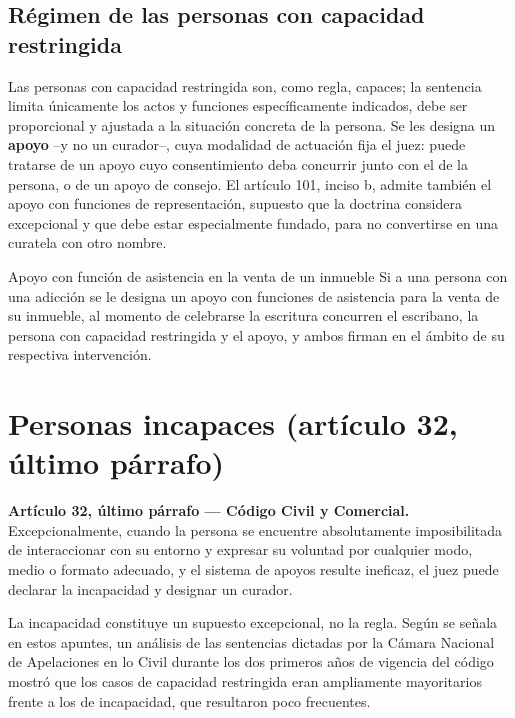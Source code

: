 \documentclass[12pt,oneside]{book}
\begin{document}
\subsection{Régimen de las personas con capacidad restringida}

Las personas con capacidad restringida son, como regla, capaces; la sentencia limita únicamente los actos y funciones específicamente indicados, debe ser proporcional y ajustada a la situación concreta de la persona. Se les designa un \textbf{apoyo} --y no un curador--, cuya modalidad de actuación fija el juez: puede tratarse de un apoyo cuyo consentimiento deba concurrir junto con el de la persona, o de un apoyo de consejo. El artículo 101, inciso b, admite también el apoyo con funciones de representación, supuesto que la doctrina considera excepcional y que debe estar especialmente fundado, para no convertirse en una curatela con otro nombre.

\begin{example}{Apoyo con función de asistencia en la venta de un inmueble}
Si a una persona con una adicción se le designa un apoyo con funciones de asistencia para la venta de su inmueble, al momento de celebrarse la escritura concurren el escribano, la persona con capacidad restringida y el apoyo, y ambos firman en el ámbito de su respectiva intervención.
\end{example}

\section{Personas incapaces (artículo 32, último párrafo)}

\begin{important}
\textbf{Artículo 32, último párrafo --- Código Civil y Comercial.} Excepcionalmente, cuando la persona se encuentre absolutamente imposibilitada de interaccionar con su entorno y expresar su voluntad por cualquier modo, medio o formato adecuado, y el sistema de apoyos resulte ineficaz, el juez puede declarar la incapacidad y designar un curador.
\end{important}

La incapacidad constituye un supuesto excepcional, no la regla. Según se señala en estos apuntes, un análisis de las sentencias dictadas por la Cámara Nacional de Apelaciones en lo Civil durante los dos primeros años de vigencia del código mostró que los casos de capacidad restringida eran ampliamente mayoritarios frente a los de incapacidad, que resultaron poco frecuentes.
\end{document}
